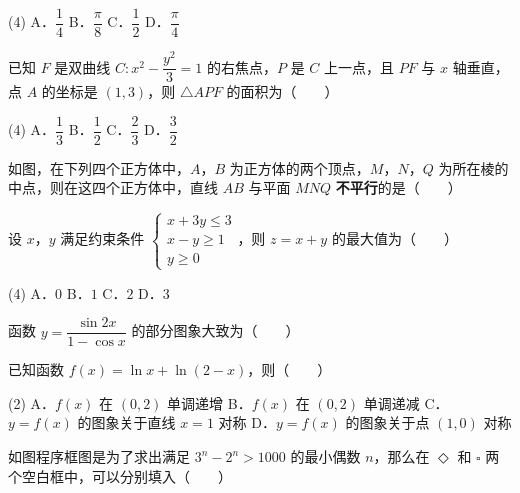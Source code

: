 \begin{gkopts}(4)
\task A．$\dfrac14$
\task B．$\dfrac\pi8$
\task C．$\dfrac12$
\task D．$\dfrac\pi4$
\end{gkopts}

已知 $F$ 是双曲线 $C:x^{2}-\dfrac{y^{2}}3=1$ 的右焦点，$P$ 是 $C$ 上一点，且 $PF$ 与 $x$ 轴垂直，点 $A$ 的坐标是 $(1,3)$，则 $\triangle APF$ 的面积为（　　）

\begin{gkopts}(4)
\task A．$\dfrac13$
\task B．$\dfrac12$
\task C．$\dfrac23$
\task D．$\dfrac32$
\end{gkopts}

如图，在下列四个正方体中，$A$，$B$ 为正方体的两个顶点，$M$，$N$，$Q$ 为所在棱的中点，则在这四个正方体中，直线 $AB$ 与平面 $MNQ$ \textbf{不平行}的是（　　）

\begin{center}\end{center}

\begin{center}\end{center}

设 $x$，$y$ 满足约束条件 $\begin{cases}x+3y\le3\\ x-y\ge1\\ y\ge0\end{cases}$，则 $z=x+y$ 的最大值为（　　）

\begin{gkopts}(4)
\task A．$0$
\task B．$1$
\task C．$2$
\task D．$3$
\end{gkopts}

函数 $y=\dfrac{\sin2x}{1-\cos x}$ 的部分图象大致为（　　）

\begin{center}\end{center}

已知函数 $f(x)=\ln x+\ln(2-x)$，则（　　）

\begin{gkopts}(2)
\task A．$f(x)$ 在 $(0,2)$ 单调递增
\task B．$f(x)$ 在 $(0,2)$ 单调递减
\task C．$y=f(x)$ 的图象关于直线 $x=1$ 对称
\task D．$y=f(x)$ 的图象关于点 $(1,0)$ 对称
\end{gkopts}

如图程序框图是为了求出满足 $3^{n}-2^{n}>1000$ 的最小偶数 $n$，那么在 $\Diamond$ 和 $\square$ 两个空白框中，可以分别填入（　　）

